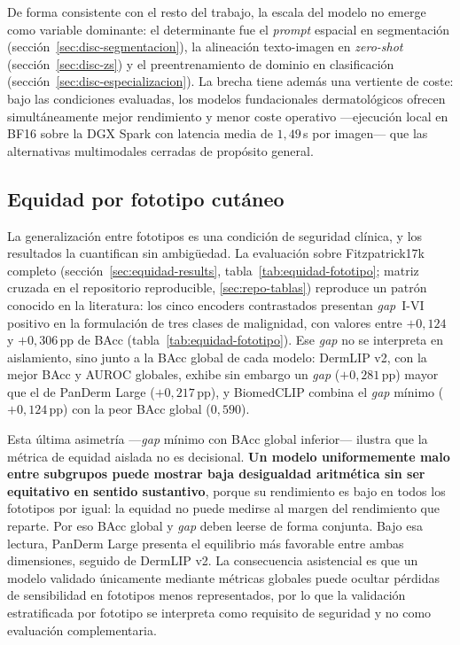 De forma consistente con el resto del trabajo, la escala del modelo no
emerge como variable dominante: el determinante fue el \emph{prompt}
espacial en segmentación (sección~\ref{sec:disc-segmentacion}), la
alineación texto-imagen en \emph{zero-shot} (sección~\ref{sec:disc-zs})
y el preentrenamiento de dominio en clasificación
(sección~\ref{sec:disc-especializacion}). La brecha tiene además una
vertiente de coste: bajo las condiciones evaluadas, los modelos
fundacionales dermatológicos ofrecen simultáneamente mejor rendimiento y
menor coste operativo ---ejecución local en BF16 sobre la DGX Spark con
latencia media de $1{,}49$\,s por imagen--- que las alternativas
multimodales cerradas de propósito general.

\subsection{Equidad por fototipo cutáneo}
\label{sec:disc-equidad}

La generalización entre fototipos es una condición de seguridad
clínica, y los resultados la cuantifican sin ambigüedad. La
evaluación sobre Fitzpatrick17k completo
(sección~\ref{sec:equidad-results}, tabla~\ref{tab:equidad-fototipo};
matriz cruzada en el repositorio reproducible, \ref{sec:repo-tablas}) reproduce un patrón conocido en la
literatura: los cinco encoders contrastados presentan \emph{gap}~I-VI
positivo en la formulación de tres clases de malignidad, con valores
entre $+0{,}124$ y $+0{,}306$\,pp de BAcc
(tabla~\ref{tab:equidad-fototipo}). Ese \emph{gap} no se interpreta en
aislamiento, sino junto a la BAcc global de cada modelo: DermLIP v2,
con la mejor BAcc y AUROC globales, exhibe sin embargo un \emph{gap}
($+0{,}281$\,pp) mayor que el de PanDerm Large ($+0{,}217$\,pp), y
BiomedCLIP combina el \emph{gap} mínimo ($+0{,}124$\,pp) con la peor
BAcc global ($0{,}590$).

Esta última asimetría ---\emph{gap} mínimo con BAcc global
inferior--- ilustra que la métrica de equidad aislada no es
decisional. \textbf{Un modelo uniformemente malo entre subgrupos puede
mostrar baja desigualdad aritmética sin ser equitativo en sentido
sustantivo}, porque su rendimiento es bajo en todos los fototipos por
igual: la equidad no puede medirse al margen del rendimiento que
reparte. Por eso BAcc global y \emph{gap} deben leerse de forma
conjunta. Bajo esa lectura, PanDerm Large presenta el equilibrio más
favorable entre ambas dimensiones, seguido de DermLIP v2. La
consecuencia asistencial es que un modelo validado únicamente mediante
métricas globales puede ocultar pérdidas de sensibilidad en fototipos
menos representados, por lo que la validación estratificada por
fototipo se interpreta como requisito de seguridad y no como evaluación
complementaria.


